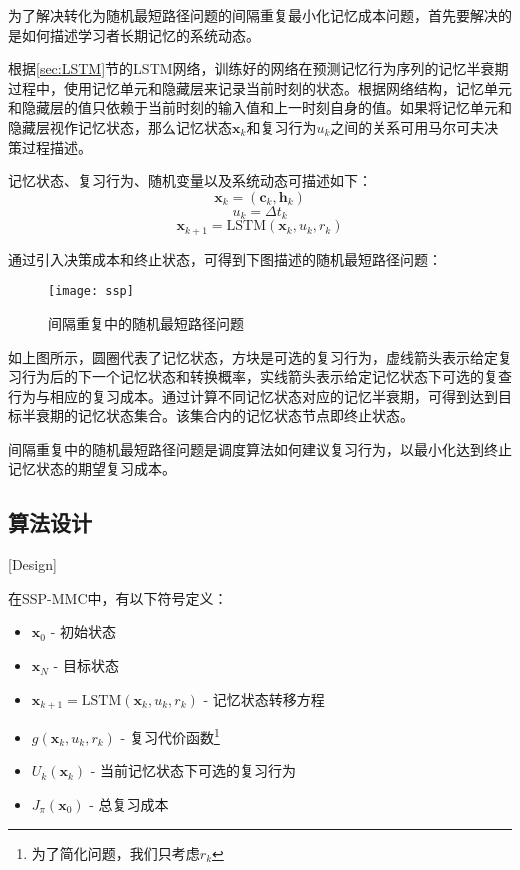 为了解决转化为随机最短路径问题的间隔重复最小化记忆成本问题，首先要解决的是如何描述学习者长期记忆的系统动态。

根据\ref{sec:LSTM}节的LSTM网络，训练好的网络在预测记忆行为序列的记忆半衰期过程中，使用记忆单元和隐藏层来记录当前时刻的状态。根据网络结构，记忆单元和隐藏层的值只依赖于当前时刻的输入值和上一时刻自身的值。如果将记忆单元和隐藏层视作记忆状态，那么记忆状态$\bm x_k$和复习行为$u_k$之间的关系可用马尔可夫决策过程描述。

记忆状态、复习行为、随机变量以及系统动态可描述如下：
\begin{equation}
\bm x_k = (\bm c_k,\bm h_k)
\end{equation}
\begin{equation}
u_{k}=\Delta t_{k}
\end{equation}
\begin{equation}
\bm x_{k+1}=\mathrm{LSTM}(\bm x_k,u_k,r_k)
\end{equation}

通过引入决策成本和终止状态，可得到下图描述的随机最短路径问题：

\begin{figure}[htpb]
    \centering
    \texttt{[image: ssp]}
    \caption{间隔重复中的随机最短路径问题}
\end{figure}

如上图所示，圆圈代表了记忆状态，方块是可选的复习行为，虚线箭头表示给定复习行为后的下一个记忆状态和转换概率，实线箭头表示给定记忆状态下可选的复查行为与相应的复习成本。通过计算不同记忆状态对应的记忆半衰期，可得到达到目标半衰期的记忆状态集合。该集合内的记忆状态节点即终止状态。

间隔重复中的随机最短路径问题是调度算法如何建议复习行为，以最小化达到终止记忆状态的期望复习成本。

\subsection{算法设计}[Design]

在SSP-MMC中，有以下符号定义：

\begin{itemize}
    \item $\bm x_0$ - 初始状态
    \item $\bm x_{N}$ - 目标状态
    \item $\bm x_{k+1} = \mathrm{LSTM}(\bm x_k,u_k,r_k)$ - 记忆状态转移方程
    \item $g(\bm x_k,u_k,r_k)$ - 复习代价函数\footnote{为了简化问题，我们只考虑$r_k$}
    \item $U_k(\bm x_k)$ - 当前记忆状态下可选的复习行为
    \item $J_\pi(\bm x_0)$ - 总复习成本
\end{itemize}

